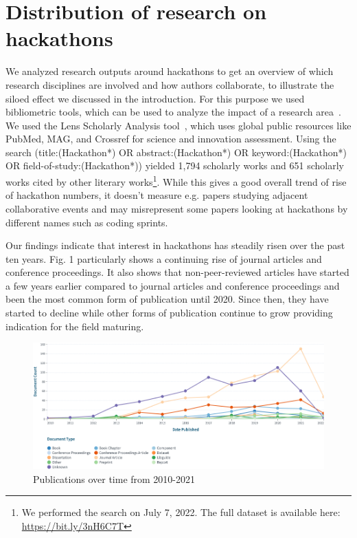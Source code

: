 \documentclass{ieeeaccess}
\begin{document}
\section{Distribution of research on hackathons}
\label{Distribution}
We analyzed research outputs around hackathons to get an overview of which research disciplines are involved and how authors collaborate, to illustrate the siloed effect we discussed in the introduction. 
For this purpose we used bibliometric tools, which can be used to analyze the impact of a research area~\cite{jefferson2017comment}. 
We used the Lens Scholarly Analysis tool~\cite{RN310}, which uses global public resources like PubMed, MAG, and Crossref for science and innovation assessment. 
Using the search (title:(Hackathon*) OR abstract:(Hackathon*) OR keyword:(Hackathon*) OR field-of-study:(Hackathon*)) yielded 1,794 scholarly works and 651 scholarly works cited by other literary works\footnote{We performed the search on July 7, 2022. The full dataset is available here: \href{https://bit.ly/3nH6C7T}{https://bit.ly/3nH6C7T}}.
While this gives a good overall trend of rise of hackathon numbers, it doesn't measure e.g. papers studying adjacent collaborative events and may misrepresent some papers looking at hackathons by different names such as coding sprints.

Our findings indicate that interest in hackathons has steadily risen over the past ten years. 
Fig. 1 %
particularly shows a continuing rise of journal articles and conference proceedings. 
It also shows that non-peer-reviewed articles have started a few years earlier compared to journal articles and conference proceedings and been the most common form of publication until 2020.
Since then, they have started to decline while other forms of publication continue to grow providing indication for the field maturing. 

\begin{figure}
\centering
\includegraphics[width=\linewidth]{over_time.png}
\caption{Publications over time from 2010-2021}
\label{fig:journals}
\vspace{-10pt}
\end{figure}
\end{document}
